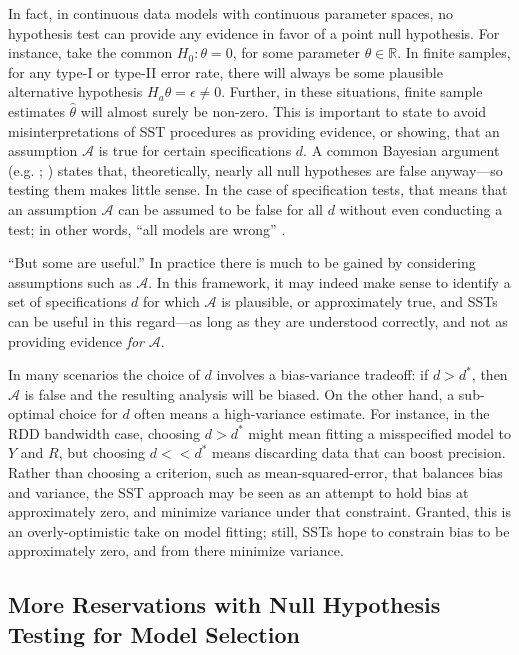 \documentclass[sts]{imsart}\usepackage[]{graphicx}\usepackage[]{color}
\newcommand{\dstar}{d^*}
\begin{document}
In fact, in continuous data models with continuous parameter spaces,
no hypothesis test can provide any evidence in favor of a point null
hypothesis.
For instance, take the common $H_0: \theta=0$, for some parameter
$\theta\in \mathbb{R}$.
In finite samples, for any type-I or type-II error rate, there will
always be some plausible alternative hypothesis $H_a
\theta=\epsilon\ne 0$.
Further, in these situations, finite sample estimates $\hat{\theta}$
will almost surely be non-zero.
This is important to state to avoid misinterpretations of SST
procedures as providing evidence, or showing, that an assumption
$\mathcal{A}$ is true for certain specifications $d$.
A common Bayesian argument (e.g. \citealp[][p. 439]{kadanePrinciples};
\citealp{gelmanBlog}) states that, theoretically, nearly all null
hypotheses are false anyway---so testing them makes little sense.
In the case of specification tests, that means that an assumption
$\mathcal{A}$ can be assumed to be false for all $d$ without even
conducting a test; in other words, ``all models are wrong''
\citep[p. 2]{modelsWrong}.

``But some are useful.''
In practice there is much to be gained by considering assumptions such
as $\mathcal{A}$.
In this framework, it may indeed make sense to identify a set of
specifications $d$ for which $\mathcal{A}$ is plausible, or
approximately true, and
SSTs can be useful in this regard---as long as they are understood
correctly, and not as providing evidence \emph{for} $\mathcal{A}$.

In many scenarios the choice of $d$ involves a bias-variance tradeoff:
if $d>\dstar$, then $\mathcal{A}$ is false and the resulting analysis
will be biased.
On the other hand, a sub-optimal choice for $d$ often means a
high-variance estimate.
For instance, in the RDD bandwidth case, choosing $d>\dstar$ might mean
fitting a misspecified model to $Y$ and $R$, but choosing $d<<\dstar$
means discarding data that can boost precision.
Rather than choosing a criterion, such as mean-squared-error, that
balances bias and variance, the SST approach may be seen as an attempt to hold
bias at approximately zero, and minimize variance under that
constraint.
Granted, this is an overly-optimistic take on model fitting;
still, SSTs hope to constrain bias to be approximately zero, and from there
minimize variance.


\subsection{More Reservations with Null Hypothesis Testing for Model
  Selection}
\end{document}
